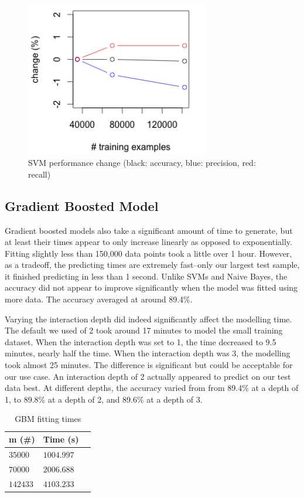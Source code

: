 \documentclass[twoside]{article}
\begin{document}
\begin{multicols}{2}
\begin{figure}[H]
 \caption{SVM performance change (black: accuracy, blue: precision, red: recall)}
  \centering
    \includegraphics[width=8cm]{../data/svm_change}
\end{figure}

\subsection{Gradient Boosted Model}
Gradient boosted models also take a significant amount of time to generate, but at least their times appear to only increase linearly as opposed to exponentially. Fitting slightly less than 150,000 data points took a little over 1 hour. However, as a tradeoff, the predicting times are extremely fast--only our largest test sample, it finished predicting in less than 1 second. Unlike SVMs and Naive Bayes, the accuracy did not appear to improve significantly when the model was fitted using more data. The accuracy averaged at around 89.4\%. 

Varying the interaction depth did indeed significantly affect the modelling time. The default we used of 2 took around 17 minutes to model the small training dataset. When the interaction depth was set to 1, the time decreased to 9.5 minutes, nearly half the time. When the interaction depth was 3, the modelling took almost 25 minutes. The difference is significant but could be acceptable for our use case. An interaction depth of 2 actually appeared to predict on our test data best. At different depths, the accuracy varied from from 89.4\% at a depth of 1, to 89.8\% at a depth of 2, and 89.6\% at a depth of 3.

\begin{table}[H]
\caption{GBM fitting times}
\centering
\begin{tabular}{llr}
\toprule
m (\#) & Time (s) \\
\midrule
$35000$ & $1004.997$ \\
$70000$ & $2006.688$ \\
$142433$ & $4103.233$ \\
\bottomrule
\end{tabular}
\end{table}


\end{multicols}
\end{document}
